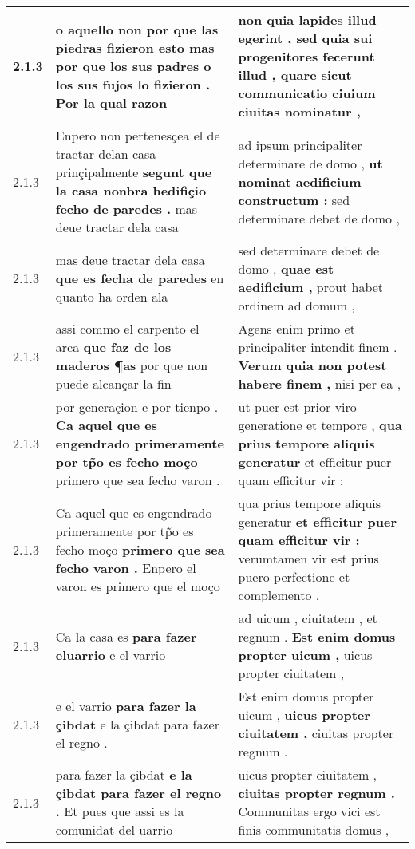 \begin{tabular}{|p{1cm}|p{6.5cm}|p{6.5cm}|}
2.1.3 & o aquello non por que las piedras fizieron esto \textbf{ mas por que los sus padres o los sus fujos lo fizieron . } Por la qual razon & non quia lapides illud egerint , \textbf{ sed quia sui progenitores fecerunt illud , } quare sicut communicatio ciuium ciuitas nominatur , \\\hline
2.1.3 & Enpero non pertenesçea el de tractar delan casa prinçipalmente \textbf{ segunt que la casa nonbra hedifiçio fecho de paredes . } mas deue tractar dela casa & ad ipsum principaliter determinare de domo , \textbf{ ut nominat aedificium constructum : } sed determinare debet de domo , \\\hline
2.1.3 & mas deue tractar dela casa \textbf{ que es fecha de paredes } en quanto ha orden ala & sed determinare debet de domo , \textbf{ quae est aedificium , } prout habet ordinem ad domum , \\\hline
2.1.3 & assi commo el carpento el arca \textbf{ que faz de los maderos ¶as } por que non puede alcançar la fin & Agens enim primo et principaliter intendit finem . \textbf{ Verum quia non potest habere finem , } nisi per ea , \\\hline
2.1.3 & por generaçion e por tienpo . \textbf{ Ca aquel que es engendrado primeramente por tp̃o es fecho moço } primero que sea fecho varon . & ut puer est prior viro generatione et tempore , \textbf{ qua prius tempore aliquis generatur } et efficitur puer quam efficitur vir : \\\hline
2.1.3 & Ca aquel que es engendrado primeramente por tp̃o es fecho moço \textbf{ primero que sea fecho varon . } Enpero el varon es primero que el moço & qua prius tempore aliquis generatur \textbf{ et efficitur puer quam efficitur vir : } verumtamen vir est prius puero perfectione et complemento , \\\hline
2.1.3 & Ca la casa es \textbf{ para fazer eluarrio } e el varrio & ad uicum , ciuitatem , et regnum . \textbf{ Est enim domus propter uicum , } uicus propter ciuitatem , \\\hline
2.1.3 & e el varrio \textbf{ para fazer la çibdat } e la çibdat para fazer el regno . & Est enim domus propter uicum , \textbf{ uicus propter ciuitatem , } ciuitas propter regnum . \\\hline
2.1.3 & para fazer la çibdat \textbf{ e la çibdat para fazer el regno . } Et pues que assi es la comunidat del uarrio & uicus propter ciuitatem , \textbf{ ciuitas propter regnum . } Communitas ergo vici est finis communitatis domus , \\\hline

\end{tabular}

